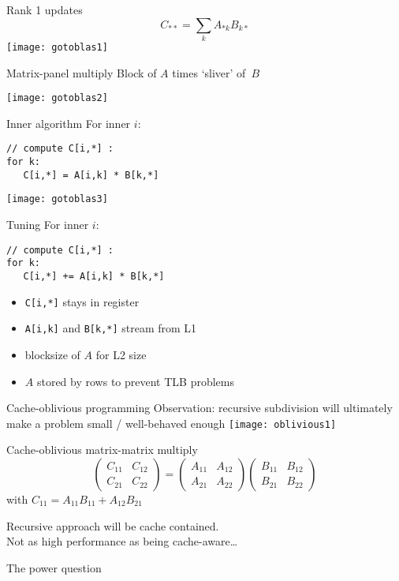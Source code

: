 \begin{numberedframe}{Rank 1 updates}
  \[ C_{**} = \sum_k A_{*k}B_{k*} \]
  \texttt{[image: gotoblas1]}
\end{numberedframe}

\begin{numberedframe}{Matrix-panel multiply}
  Block of $A$ times `sliver' of~$B$

  \texttt{[image: gotoblas2]}  
\end{numberedframe}

\begin{numberedframe}{Inner algorithm}
For inner $i$:
\begin{verbatim}
// compute C[i,*] :
for k:
   C[i,*] = A[i,k] * B[k,*]
\end{verbatim}
  \texttt{[image: gotoblas3]}
\end{numberedframe}

\begin{numberedframe}{Tuning}
For inner $i$:
\begin{verbatim}
// compute C[i,*] :
for k:
   C[i,*] += A[i,k] * B[k,*]
\end{verbatim}
\begin{itemize}
\item \verb+C[i,*]+ stays in register
\item \verb+A[i,k]+ and \verb+B[k,*]+ stream from L1
\item blocksize of $A$ for L2 size
\item $A$ stored by rows to prevent TLB problems
\end{itemize}
\end{numberedframe}

\begin{numberedframe}{Cache-oblivious programming}
Observation: recursive subdivision will ultimately
make a problem small / well-behaved enough
  \texttt{[image: oblivious1]}
\end{numberedframe}

\begin{numberedframe}{Cache-oblivious matrix-matrix multiply}
  \[ 
  \begin{pmatrix}
    C_{11}&C_{12}\\ C_{21}&C_{22}
  \end{pmatrix}
  =
  \begin{pmatrix}
    A_{11}&A_{12}\\ A_{21}&A_{22}
  \end{pmatrix}
  \begin{pmatrix}
    B_{11}&B_{12}\\ B_{21}&B_{22}
  \end{pmatrix}
  \]
  with $C_{11}=A_{11}B_{11}+A_{12}B_{21}$

  Recursive approach will be cache contained.\\
  Not as high performance as being cache-aware\ldots  
\end{numberedframe}

 {The power question}

\endinput

\begin{numberedframe}{}
  \begin{itemize}
  \item 
  \end{itemize}
\begin{lstlisting}
\end{lstlisting}
\end{numberedframe}


